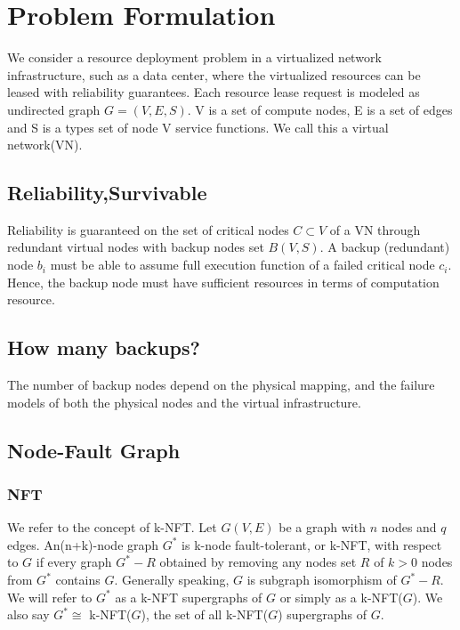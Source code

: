 
\section{Problem Formulation}
\label{sec:ProblemFormulation}

We consider a resource deployment problem in a virtualized network infrastructure, such as a data center, where the virtualized resources can be leased with reliability guarantees. Each resource lease request is modeled as undirected graph $G=(V,E,S)$. V is a set of compute nodes, E is a set of edges and S is a types set of node V service functions. We call this a virtual network(VN).



\subsection{Reliability,Survivable}
Reliability is guaranteed on the set of critical nodes $C\subset V$ of a VN through redundant virtual nodes with backup nodes set $B(V,S)$. A backup (redundant) node $b_i$ must be able to assume full execution function of a failed critical node $c_i$. Hence, the backup node must have sufficient resources in terms of computation resource.


\subsection{How many backups?}
The number of backup nodes depend on the physical mapping, and the failure models of both the physical nodes and the virtual infrastructure.


\subsection{Node-Fault Graph}
\subsubsection{NFT}
We refer to the concept of k-NFT\cite{harary1996node}. Let $G(V,E)$ be a graph with $n$ nodes and $q$ edges. An(n+k)-node graph $G^*$ is k-node fault-tolerant, or k-NFT, with respect to $G$ if every graph $G^*-R$ obtained by removing any nodes set $R$ of $k>0$ nodes from $G^*$ contains $G$. Generally speaking, $G$ is subgraph isomorphism of $G^*-R$. We will refer to $G^*$ as a k-NFT supergraphs of $G$ or simply as a k-NFT($G$). We also say $G^*\cong$ k-NFT($G$), the set of all k-NFT($G$) supergraphs of $G$.

